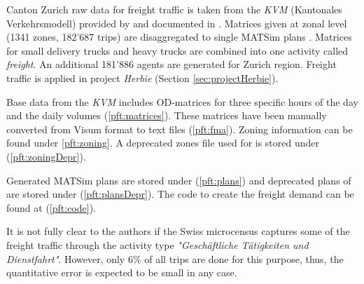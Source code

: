 Canton Zurich raw data for freight traffic is taken from the \emph{KVM} (Kantonales Verkehrsmodell) provided by \citet{AMV_Webpage_2011} and documented in \citet[][]{GottardiBuergler_SV_1999}. Matrices given at zonal level (1341 zones, 182'687 trips) are disaggregated to single MATSim plans \citep[][]{ShahM_TechRep_IVT_2010}. Matrices for small delivery trucks and heavy trucks are combined into one activity called \emph{freight}. An additional 181'886 agents are generated for Zurich region. Freight traffic is applied in project \emph{Herbie} (Section \ref{sec:projectHerbie}).

Base data from the \emph{KVM} includes OD-matrices for three specific hours of the day and the daily volumes (\ref{pft:matrices}). These matrices have been manually converted from Visum format to text files (\ref{pft:fma}). Zoning information can be found under \ref{pft:zoning}. A deprecated zones file used for \citet[][]{ShahM_TechRep_IVT_2010} is stored under (\ref{pft:zoningDepr}).

Generated MATSim plans are stored under (\ref{pft:plans}) and deprecated plans of \citet[][]{ShahM_TechRep_IVT_2010} are stored under (\ref{pft:plansDepr}). The code to create the freight demand can be found at (\ref{pft:code}).

It is not fully clear to the authors if the Swiss microcensus captures some of the freight traffic through the activity type \emph{"Geschäftliche Tätigkeiten und Dienstfahrt"}. However, only $6\%$ of all trips are done for this purpose, thus, the quantitative error is expected to be small in any case.

